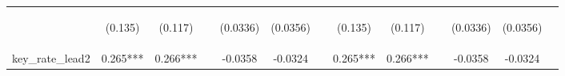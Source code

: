 \documentclass[]{article}
\begin{document}
\begin{center}
\begin{tabular}{lcccccccccccc}
\vspace{4pt} & \begin{footnotesize}(0.135)\end{footnotesize} & \begin{footnotesize}(0.117)\end{footnotesize} & \begin{footnotesize}\end{footnotesize} & \begin{footnotesize}(0.0336)\end{footnotesize} & \begin{footnotesize}(0.0356)\end{footnotesize} & \begin{footnotesize}\end{footnotesize} & \begin{footnotesize}(0.135)\end{footnotesize} & \begin{footnotesize}(0.117)\end{footnotesize} & \begin{footnotesize}\end{footnotesize} & \begin{footnotesize}(0.0336)\end{footnotesize} & \begin{footnotesize}(0.0356)\end{footnotesize} & \begin{footnotesize}\end{footnotesize} \\
key\_rate\_lead2 & 0.265*** & 0.266*** &  & -0.0358 & -0.0324 &  & 0.265*** & 0.266*** &  & -0.0358 & -0.0324 &  \\

\end{tabular}
\end{center}
\end{document}
